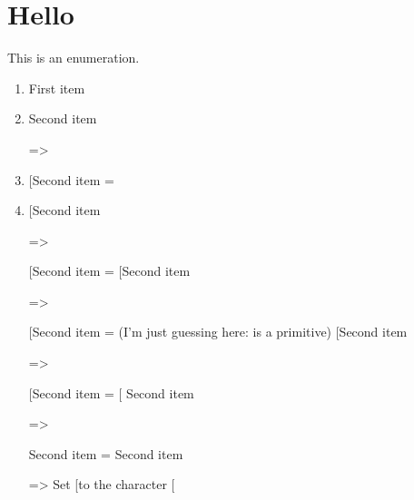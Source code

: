 \documentclass{article}
\begin{document}
\section{Hello}

This is an enumeration.

\begin{enumerate}
\item First item

\item Second item

=>

\@inmatherr \item \@ifnextchar [\@item {\@noitemargtrue \@item [\@itemlabel ]}Second item
=
\@inmatherr
    \item
\@ifnextchar [\@item {\@noitemargtrue \@item [\@itemlabel ]}Second item

=>

\relax \ifmmode {}\@ehc \fi
\@ifnextchar [\@item {\@noitemargtrue \@item [\@itemlabel ]}Second item
=
\relax
\ifmmode {}\@ehc \fi
\@ifnextchar [\@item {\@noitemargtrue \@item [\@itemlabel ]}Second item

=>

\ifmmode {}\@ehc \fi
\@ifnextchar [\@item {\@noitemargtrue \@item [\@itemlabel ]}Second item
= (I'm just guessing here: \ifmmode is a primitive)
\ifmmode
    \@ehc \fi
\@ifnextchar [\@item {\@noitemargtrue \@item [\@itemlabel ]}Second item

=>

\@ifnextchar [\@item {\@noitemargtrue \@item [\@itemlabel ]}Second item
=
\@ifnextchar
    [
    \@item
    {\@noitemargtrue \@item [\@itemlabel ]}
Second item

=>

\let \reserved@d =[\def \reserved@a {\@item }\def \reserved@b {\@noitemargtrue \@item [\@itemlabel ]}\futurelet \@let@token \@ifnch
Second item
=
\let \reserved@d =[
\def \reserved@a {\@item }\def \reserved@b {\@noitemargtrue \@item [\@itemlabel ]}\futurelet \@let@token \@ifnch
Second item

=> Set \reserved@d to the character [


\end{enumerate}
\end{document}
